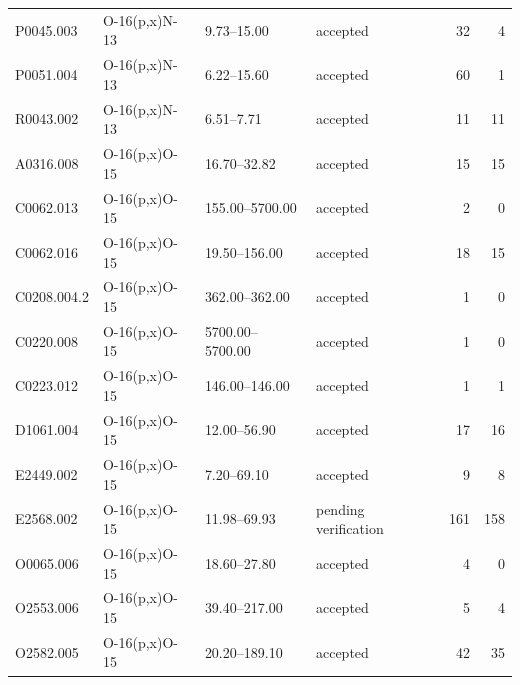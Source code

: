 \begin{longtable}{llllrr}
P0045.003 & O-16(p,x)N-13 & 9.73--15.00 & accepted & 32 & 4 \\
P0051.004 & O-16(p,x)N-13 & 6.22--15.60 & accepted & 60 & 1 \\
R0043.002 & O-16(p,x)N-13 & 6.51--7.71 & accepted & 11 & 11 \\
A0316.008 & O-16(p,x)O-15 & 16.70--32.82 & accepted & 15 & 15 \\
C0062.013 & O-16(p,x)O-15 & 155.00--5700.00 & accepted & 2 & 0 \\
C0062.016 & O-16(p,x)O-15 & 19.50--156.00 & accepted & 18 & 15 \\
C0208.004.2 & O-16(p,x)O-15 & 362.00--362.00 & accepted & 1 & 0 \\
C0220.008 & O-16(p,x)O-15 & 5700.00--5700.00 & accepted & 1 & 0 \\
C0223.012 & O-16(p,x)O-15 & 146.00--146.00 & accepted & 1 & 1 \\
D1061.004 & O-16(p,x)O-15 & 12.00--56.90 & accepted & 17 & 16 \\
E2449.002 & O-16(p,x)O-15 & 7.20--69.10 & accepted & 9 & 8 \\
E2568.002 & O-16(p,x)O-15 & 11.98--69.93 & pending verification & 161 & 158 \\
O0065.006 & O-16(p,x)O-15 & 18.60--27.80 & accepted & 4 & 0 \\
O2553.006 & O-16(p,x)O-15 & 39.40--217.00 & accepted & 5 & 4 \\
O2582.005 & O-16(p,x)O-15 & 20.20--189.10 & accepted & 42 & 35 \\
\bottomrule
\end{longtable}

